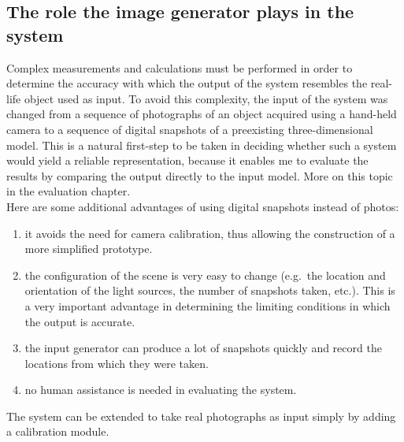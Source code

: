 \documentclass[12pt,a4paper,twoside,openright]{report}
\begin{document}
\subsection{The role the image generator plays in the system}
Complex measurements and calculations must be performed in order to determine the accuracy with which the output of the system resembles the real-life object used as input. To avoid this complexity, the input of the system was changed from a sequence of photographs of an object acquired using a hand-held camera to a sequence of digital snapshots of a preexisting three-dimensional model. This is a natural first-step to be taken in deciding whether such a system would yield a reliable representation, because it enables me to evaluate the results by comparing the output directly to the input model. More on this topic in the evaluation chapter.\\
Here are some additional advantages of using digital snapshots instead of photos: 
\begin{enumerate}
\item it avoids the need for camera calibration, thus allowing the construction of a more simplified prototype.
\item the configuration of the scene is very easy to change (e.g.\ the location and orientation of the light sources, the number of snapshots taken, etc.). This is a very important advantage in determining the limiting conditions in which the output is accurate.
\item the input generator can produce a lot of snapshots quickly and record the locations from which they were taken.
\item no human assistance is needed in evaluating the system.
\end{enumerate}
The system can be extended to take real photographs as input simply by adding a calibration module.
\end{document}
